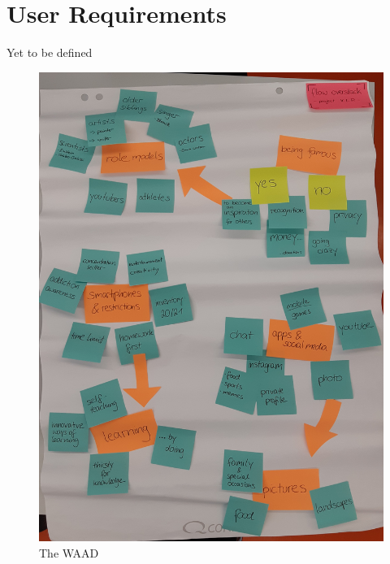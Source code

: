 \documentclass[12pt]{scrartcl}
\begin{document}
\section*{User Requirements}
	Yet to be defined
	
	
\begin{figure}[h]
	\includegraphics[width=\textwidth]{WAAD.jpg}
	\caption{The WAAD}
	\label{WAAD}
\end{figure}
\end{document}
